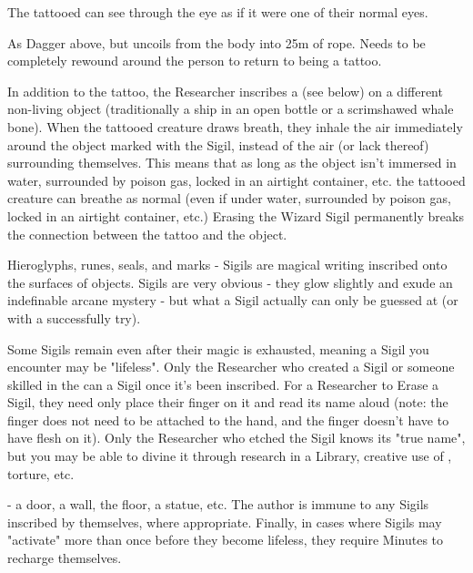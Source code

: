
The tattooed can see through the eye as if it were one of their normal eyes.


As Dagger above, but uncoils from the body into 25m of rope. Needs to be completely rewound around the person to return to being a tattoo.



In addition to the tattoo, the Researcher inscribes a  (see below) on a different non-living object (traditionally a ship in an open bottle or a scrimshawed whale bone). When the tattooed creature draws breath, they inhale the air immediately around the object marked with the Sigil, instead of the air (or lack thereof) surrounding themselves. This means that as long as the object isn't immersed in water, surrounded by poison gas, locked in an airtight container, etc. the tattooed creature can breathe as normal (even if under water, surrounded by poison gas, locked in an airtight container, etc.) Erasing the Wizard Sigil permanently breaks the connection between the tattoo and the object.

\newpage


Hieroglyphs, runes, seals, and marks - Sigils are magical writing inscribed onto the surfaces of objects. Sigils are very obvious - they glow slightly and exude an indefinable arcane mystery - but what a Sigil actually  can only be guessed at (or with a successfully  try). 

Some Sigils remain even after their magic is exhausted, meaning a Sigil you encounter may be "lifeless". Only the Researcher who created a Sigil or someone skilled in the  can  a Sigil once it's been inscribed. For a Researcher to Erase a Sigil, they need only place their finger on it and read its name aloud (note: the finger does not need to be attached to the hand, and the finger doesn't have to have flesh on it).  Only the Researcher who etched the Sigil knows its "true name", but you may be able to divine it through research in a Library, creative use of , torture, etc.

 - a door, a wall, the floor, a statue, etc.  The author is immune to any Sigils inscribed by themselves, where appropriate. Finally, in cases where Sigils may "activate" more than once before they become lifeless, they require Minutes to recharge themselves.

